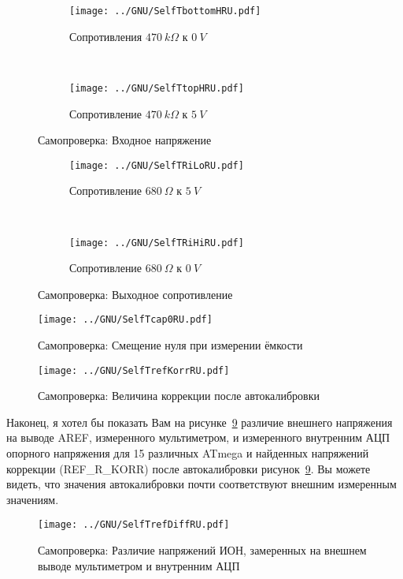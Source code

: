 \begin{figure}[H]
  \begin{subfigure}[b]{.5\textwidth}
  \centering
    \texttt{[image: ../GNU/SelfTbottomHRU.pdf]}
    \caption{Сопротивления \(470~k\Omega\) к \(0~V\)}
    \label{fig:SelfTlowH}
  \end{subfigure}
  ~
  \begin{subfigure}[b]{.5\textwidth}
  \centering
    \texttt{[image: ../GNU/SelfTtopHRU.pdf]}
    \caption{Сопротивление \(470~k\Omega\) к \(5~V\)}
    \label{fig:SelfTtopH}
  \end{subfigure}
  \caption{Самопроверка: Входное напряжение}
\end{figure}

\begin{figure}[H]
  \begin{subfigure}[b]{.5\textwidth}
  \centering
    \texttt{[image: ../GNU/SelfTRiLoRU.pdf]}
    \caption{Сопротивление \(680~\Omega\) к \(5~V\)}
    \label{fig:SelfTRoL}
  \end{subfigure}
  ~
  \begin{subfigure}[b]{.5\textwidth}
  \centering
    \texttt{[image: ../GNU/SelfTRiHiRU.pdf]}
    \caption{Сопротивление \(680~\Omega\) к \(0~V\)}
    \label{fig:SelfTRoH}
  \end{subfigure}
  \caption{Самопроверка: Выходное сопротивление}
\end{figure}

\begin{figure}[H]
  \centering
  \texttt{[image: ../GNU/SelfTcap0RU.pdf]}
  \caption{Самопроверка: Смещение нуля при измерении ёмкости}
  \label{fig:SelfTcap}
\end{figure}

\begin{figure}[H]
  \centering
  \texttt{[image: ../GNU/SelfTrefKorrRU.pdf]}
  \caption{Самопроверка: Величина коррекции после автокалибровки}
  \label{fig:SelfTrefKorr}
\end{figure}

Наконец, я хотел бы показать Вам на рисунке~\ref{fig:SelfTrefDiff}  различие внешнего напряжения на выводе AREF, 
измеренного мультиметром, и измеренного внутренним  АЦП опорного напряжения для 15 различных ATmega и найденных 
напряжений коррекции (REF\_R\_KORR) после автокалибровки рисунок~\ref{fig:SelfTrefDiff}.
Вы можете видеть, что значения автокалибровки почти соответствуют внешним измеренным значениям.

\begin{figure}[H]
  \centering
  \texttt{[image: ../GNU/SelfTrefDiffRU.pdf]}
  \caption{Самопроверка: Различие напряжений ИОН, замеренных на внешнем выводе мультиметром и внутренним АЦП}
  \label{fig:SelfTrefDiff}
\end{figure}

